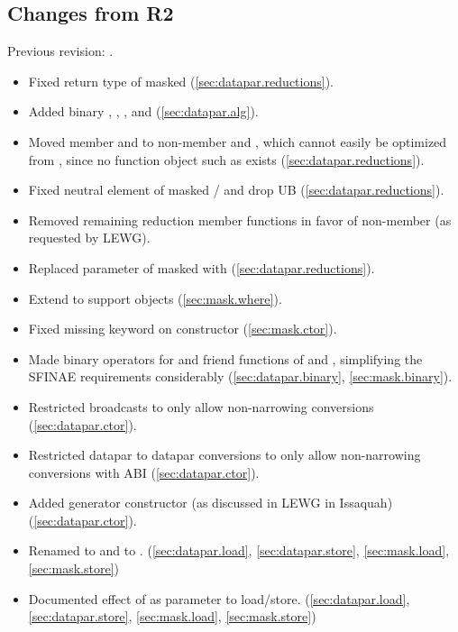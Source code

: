 \subsection{Changes from R2}
Previous revision: \parencite{P0214R2}.
\begin{itemize}
    \item Fixed return type of masked  (\ref{sec:datapar.reductions}).
    \item Added binary , , , and  (\ref{sec:datapar.alg}).
    \item Moved member  and  to non-member  and , which cannot easily be optimized from , since no function object such as  exists (\ref{sec:datapar.reductions}).
    \item Fixed neutral element of masked / and drop UB (\ref{sec:datapar.reductions}).
    \item Removed remaining reduction member functions in favor of non-member  (as requested by LEWG).
    \item Replaced  parameter of masked  with  (\ref{sec:datapar.reductions}).
    \item Extend  to support \const \datapar objects (\ref{sec:mask.where}).
    \item Fixed missing  keyword on  constructor (\ref{sec:mask.ctor}).
    \item Made binary operators for \datapar and \mask friend functions of \datapar and \mask, simplifying the SFINAE requirements considerably (\ref{sec:datapar.binary}, \ref{sec:mask.binary}).
    \item Restricted broadcasts to only allow non-narrowing conversions (\ref{sec:datapar.ctor}).
    \item Restricted datapar to datapar conversions to only allow non-narrowing conversions with  ABI (\ref{sec:datapar.ctor}).
    \item Added generator constructor (as discussed in LEWG in Issaquah) (\ref{sec:datapar.ctor}).
    \item Renamed  to  and  to . (\ref{sec:datapar.load}, \ref{sec:datapar.store}, \ref{sec:mask.load}, \ref{sec:mask.store})
    \item Documented effect of  as  parameter to load/store. (\ref{sec:datapar.load}, \ref{sec:datapar.store}, \ref{sec:mask.load}, \ref{sec:mask.store})

\end{itemize}
